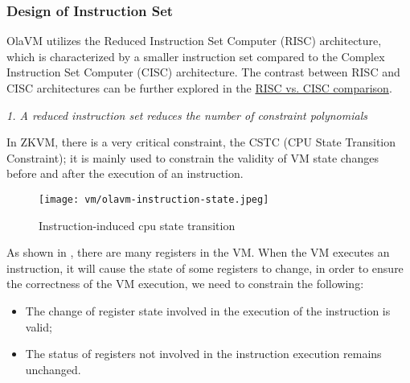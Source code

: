 \subsubsection{Design of Instruction Set} \label{sec:design-instruction-set}

OlaVM utilizes the Reduced Instruction Set Computer (RISC) architecture, which is characterized by a smaller instruction set 
compared to the Complex Instruction Set Computer (CISC) architecture.
The contrast between RISC and CISC architectures can be further explored in the \href{https://cs.stanford.edu/people/eroberts/courses/soco/projects/risc/risccisc/}{RISC vs. CISC comparison}.

\emph{1. A reduced instruction set reduces the number of constraint polynomials}

In ZKVM, there is a very critical constraint, the CSTC (CPU State Transition Constraint); it is mainly used to constrain the validity
of VM state changes before and after the execution of an instruction.

\begin{figure}[!ht]
    \centering
    \texttt{[image: vm/olavm-instruction-state.jpeg]}
    \caption{Instruction-induced cpu state transition}
    \label{fig:instruction-cpu-state-transition}
\end{figure}

As shown in , there are many registers in the VM. When the VM executes an instruction, it will
cause the state of some registers to change, in order to ensure the correctness of the VM execution, we need to constrain the following:
\begin{itemize}
    \item The change of register state involved in the execution of the instruction is valid;
    \item The status of registers not involved in the instruction execution remains unchanged.
\end{itemize}

